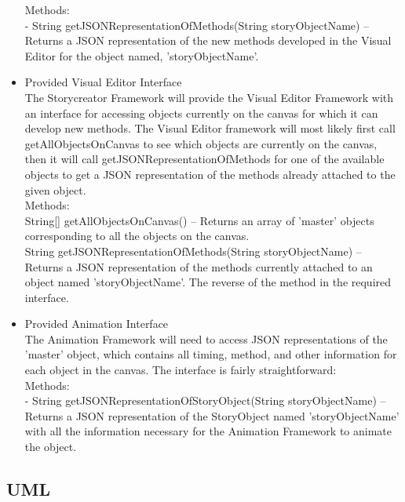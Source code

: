 \documentclass[12pt]{article}
\begin{document}
\begin{itemize}
	Methods: \\
	\indent - String getJSONRepresentationOfMethods(String storyObjectName) -- Returns a JSON representation of the new methods developed in the Visual Editor for the object named, 'storyObjectName'. \\
	
	\item Provided Visual Editor Interface \\
	The Storycreator Framework will provide the Visual Editor Framework with an interface for accessing objects currently on the canvas for which it can develop new methods. The Visual Editor framework will most likely first call getAllObjectsOnCanvas to see which objects are currently on the canvas, then it will call getJSONRepresentationOfMethods for one of the available objects to get a JSON representation of the methods already attached to the given object.  \\
	
	Methods: \\
	\indent String[] getAllObjectsOnCanvas() -- Returns an array of 'master' objects corresponding to all the objects on the canvas. \\
	
	\indent 	 String getJSONRepresentationOfMethods(String storyObjectName) -- Returns a JSON representation of the methods currently attached to an object named 'storyObjectName'. The reverse of the method in the required interface. \\
	
	\item Provided Animation Interface \\
	The Animation Framework will need to access JSON representations of the 'master' object, which contains all timing, method, and other information for each object in the canvas. The interface is fairly straightforward: \\
	
	Methods: \\
	\indent - String getJSONRepresentationOfStoryObject(String storyObjectName) -- Returns a JSON representation of the StoryObject named 'storyObjectName' with all the information necessary for the Animation Framework to animate the object. \\
	
\end{itemize}
\subsection{UML}
\end{document}
